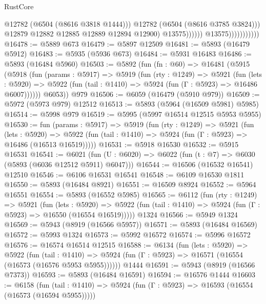 \begin{lexlean}{RustCore}
\begin{coremodule}
                                            @12782
                                            (@6504 (@8616 @3818 @1444)))
                                          @12782
                                          (@6504 (@8616 @3785 @3824)))
                                        @12879
                                        @12882
                                        @12885
                                        @12889
                                        @12894
                                        @12900)
                                      @13575))))))
                          @13575)))))))))))
@16478 := @5889 @673
@16479 := @5897 @12509
@16481 := @5893 (@16479 @5912)
@16483 := @5935 (@5936 @673)
@16484 := @5931 @16483
@16486 := @5893 (@16484 @5960)
@16503 := @5892
    (fun (fn : @60) =>
    @16481
      (@5915
        (@5918
          (fun (params : @5917) =>
          @5919
            (fun (rty : @1249) =>
            @5921
              (fun (lets : @5920) =>
              @5922 (fun (tail : @1410) => @5924 (fun (Γ : @5923) => @16486 @6007))))))
        @6053))
    @979
@16506 := @6059 (@16479 (@5910 @979))
@16509 := @5972 (@5973 @979) @12512
@16513 := @5893 (@5964 (@16509 @5981) @5985)
@16514 := @5998 @979
@16519 := @5995 (@5997 @16514 @12515 @5953 @5955)
@16530 := fun (params : @5917) =>
  @5919
    (fun (rty : @1249) =>
    @5921
      (fun (lets : @5920) =>
      @5922 (fun (tail : @1410) => @5924 (fun (Γ : @5923) => @16486 (@16513 @16519)))))
@16531 := @5918 @16530
@16532 := @5915 @16531
@16541 := @6021
    (fun (U : @6020) => @6022 (fun (t : @7) => @6030 (@5893 (@6036 @12512 @5911) @6047)))
@16544 := @16506 (@16532 @16541) @12510
@16546 := @6106 @16531 @16541
@16548 := @6109 @16530 @1811
@16550 := @5893 (@16484 @8921)
@16551 := @16509 @8924
@16552 := @5964 @16551
@16554 := @5893 (@16552 @5985)
@16565 := @6112
    (fun (rty : @1249) =>
    @5921
      (fun (lets : @5920) =>
      @5922 (fun (tail : @1410) => @5924 (fun (Γ : @5923) => @16550 (@16554 @16519)))))
    @1324
@16566 := @5949 @1324
@16569 := @5943 (@8919 (@16566 @5957))
@16571 := @5893 (@16484 @16569)
@16572 := @5993 @1324
@16573 := @5992 @16572
@16574 := @5996 @16572
@16576 := @16574 @16514 @12515
@16588 := @6134
    (fun (lets : @5920) =>
    @5922
      (fun (tail : @1410) =>
      @5924 (fun (Γ : @5923) => @16571 (@16554 (@16573 (@16576 @5953 @5955))))))
    @1444
@16591 := @5943 (@8919 (@16566 @7373))
@16593 := @5893 (@16484 @16591)
@16594 := @16576 @1444
@16603 := @6158
    (fun (tail : @1410) => @5924 (fun (Γ : @5923) => @16593 (@16554 (@16573 (@16594 @5955)))))

\end{coremodule}
\end{lexlean}
